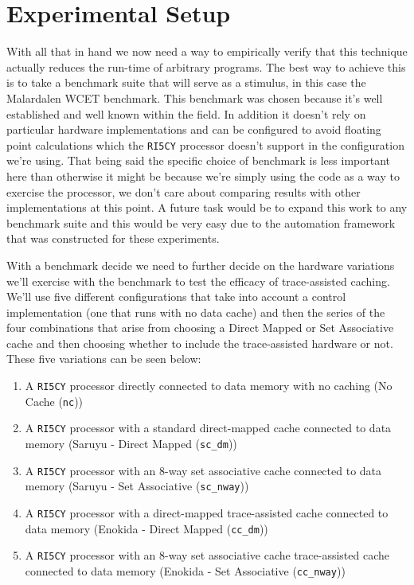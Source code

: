 \section{Experimental Setup}

With all that in hand we now need a way to empirically verify that this technique actually reduces the run-time of arbitrary programs. The best way to achieve this is to take a benchmark suite that will serve as a stimulus, in this case the Malardalen WCET \cite{gustafssonMalardalenWCETBenchmarks2010} benchmark. This benchmark was chosen because it's well established and well known within the field. In addition it doesn't rely on particular hardware implementations and can be configured to avoid floating point calculations which the \texttt{RI5CY} processor doesn't support in the configuration we're using. That being said the specific choice of benchmark is less important here than otherwise it might be because we're simply using the code as a way to exercise the processor, we don't care about comparing results with other implementations at this point. A future task would be to expand this work to any benchmark suite and this would be very easy due to the automation framework that was constructed for these experiments.

With a benchmark decide we need to further decide on the hardware variations we'll exercise with the benchmark to test the efficacy of trace-assisted caching. We'll use five different configurations that take into account a control implementation (one that runs with no data cache) and then the series of the four combinations that arise from choosing a Direct Mapped or Set Associative cache and then choosing whether to include the trace-assisted hardware or not. These five variations can be seen below:

\begin{enumerate}
	\item A \texttt{RI5CY} processor directly connected to data memory with no caching (No Cache (\texttt{nc}))
	\item A \texttt{RI5CY} processor with a standard direct-mapped cache connected to data memory (Saruyu - Direct Mapped (\texttt{sc\_dm}))
	\item A \texttt{RI5CY} processor with an 8-way set associative cache connected to data memory (Saruyu - Set Associative (\texttt{sc\_nway}))
	\item A \texttt{RI5CY} processor with a direct-mapped trace-assisted cache connected to data memory (Enokida - Direct Mapped (\texttt{cc\_dm}))
	\item A \texttt{RI5CY} processor with an 8-way set associative cache trace-assisted cache connected to data memory (Enokida - Set Associative (\texttt{cc\_nway}))
\end{enumerate}

